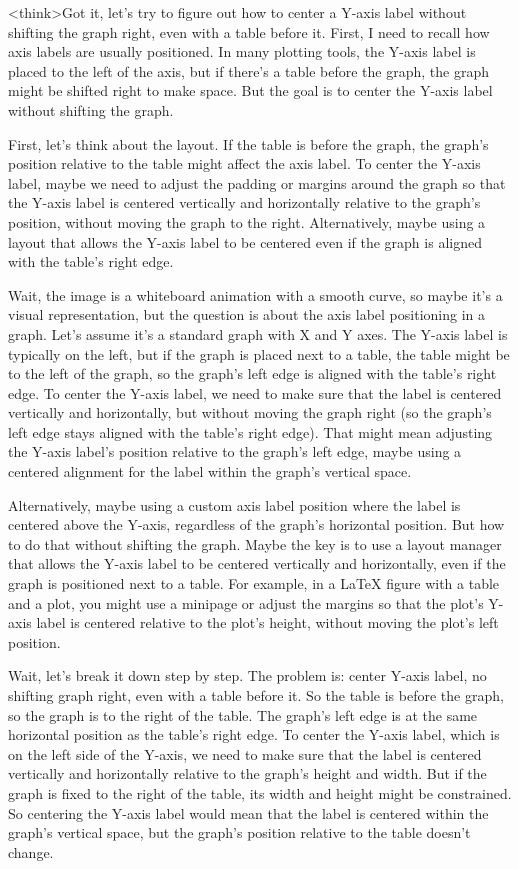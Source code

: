 <think>Got it, let's try to figure out how to center a Y-axis label without shifting the graph right, even with a table before it. First, I need to recall how axis labels are usually positioned. In many plotting tools, the Y-axis label is placed to the left of the axis, but if there's a table before the graph, the graph might be shifted right to make space. But the goal is to center the Y-axis label without shifting the graph.

First, let's think about the layout. If the table is before the graph, the graph's position relative to the table might affect the axis label. To center the Y-axis label, maybe we need to adjust the padding or margins around the graph so that the Y-axis label is centered vertically and horizontally relative to the graph's position, without moving the graph to the right. Alternatively, maybe using a layout that allows the Y-axis label to be centered even if the graph is aligned with the table's right edge.

Wait, the image is a whiteboard animation with a smooth curve, so maybe it's a visual representation, but the question is about the axis label positioning in a graph. Let's assume it's a standard graph with X and Y axes. The Y-axis label is typically on the left, but if the graph is placed next to a table, the table might be to the left of the graph, so the graph's left edge is aligned with the table's right edge. To center the Y-axis label, we need to make sure that the label is centered vertically and horizontally, but without moving the graph right (so the graph's left edge stays aligned with the table's right edge). That might mean adjusting the Y-axis label's position relative to the graph's left edge, maybe using a centered alignment for the label within the graph's vertical space.

Alternatively, maybe using a custom axis label position where the label is centered above the Y-axis, regardless of the graph's horizontal position. But how to do that without shifting the graph. Maybe the key is to use a layout manager that allows the Y-axis label to be centered vertically and horizontally, even if the graph is positioned next to a table. For example, in a LaTeX figure with a table and a plot, you might use a minipage or adjust the margins so that the plot's Y-axis label is centered relative to the plot's height, without moving the plot's left position.

Wait, let's break it down step by step. The problem is: center Y-axis label, no shifting graph right, even with a table before it. So the table is before the graph, so the graph is to the right of the table. The graph's left edge is at the same horizontal position as the table's right edge. To center the Y-axis label, which is on the left side of the Y-axis, we need to make sure that the label is centered vertically and horizontally relative to the graph's height and width. But if the graph is fixed to the right of the table, its width and height might be constrained. So centering the Y-axis label would mean that the label is centered within the graph's vertical space, but the graph's position relative to the table doesn't change.

